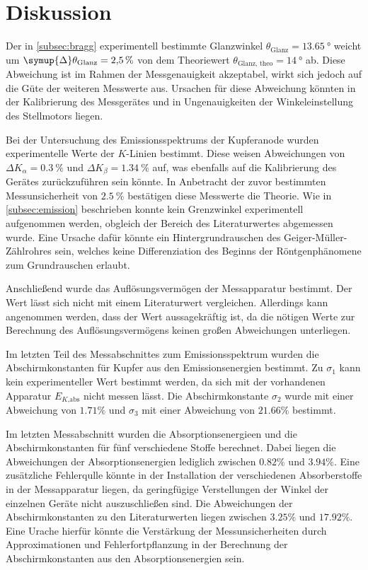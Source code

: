 \section{Diskussion}
\label{sec:Diskussion}
Der in \autoref{subsec:bragg} experimentell bestimmte Glanzwinkel $\theta_\text{Glanz} = \qty{13.65}{\degree}$ weicht um $\symup{\Delta} \theta_\text{Glanz} = \qty{2.5}{\percent}$
von dem Theoriewert $\theta_\text{Glanz, theo} = \qty{14}{\degree}$ ab. Diese Abweichung ist im Rahmen der Messgenauigkeit akzeptabel, wirkt sich jedoch auf die Güte 
der weiteren Messwerte aus. Ursachen für diese Abweichung könnten in der Kalibrierung des Messgerätes und in Ungenauigkeiten der Winkeleinstellung des Stellmotors liegen.

Bei der Untersuchung des Emissionsspektrums der Kupferanode wurden experimentelle Werte der $K$-Linien bestimmt. Diese weisen Abweichungen 
von $\Delta K_{\alpha} = \qty{0.3}{\percent}$ und $\Delta K_{\beta} = \qty{1.34}{\percent}$ auf, was ebenfalls auf die Kalibrierung des Gerätes zurückzuführen sein könnte.
In Anbetracht der zuvor bestimmten Messunsicherheit von $\qty{2.5}{\percent}$ bestätigen diese Messwerte die Theorie.
Wie in \autoref{subsec:emission} beschrieben konnte kein Grenzwinkel experimentell aufgenommen werden, obgleich der Bereich des Literaturwertes
abgemessen wurde. Eine Ursache dafür könnte ein Hintergrundrauschen des Geiger-Müller-Zählrohres sein, welches keine Differenziation des Beginns der Röntgenphänomene 
zum Grundrauschen erlaubt.  

Anschließend wurde das Auflösungsvermögen der Messapparatur bestimmt. Der Wert lässt sich nicht mit einem Literaturwert vergleichen. Allerdings kann angenommen werden, 
dass der Wert aussagekräftig ist, da die nötigen Werte zur Berechnung des Auflösungsvermögens keinen großen Abweichungen unterliegen.

Im letzten Teil des Messabschnittes zum Emissionsspektrum wurden die Abschirmkonstanten für Kupfer aus den Emissionsenergien bestimmt. Zu $\sigma_1$ kann kein experimenteller
Wert bestimmt werden, da sich mit der vorhandenen Apparatur $E_{K \text{,abs}}$ nicht messen lässt.
Die Abschirmkonstante $\sigma_2$ wurde mit einer Abweichung von $1.71\%$ und $\sigma_3$ mit einer Abweichung von $21.66\%$ bestimmt.

Im letzten Messabschnitt wurden die Absorptionsenergieen und die Abschirmkonstanten für fünf verschiedene Stoffe berechnet. Dabei liegen die Abweichungen der 
Absorptionsenergien lediglich zwischen $0.82\%$ und $3.94\%$. Eine zusätzliche Fehlerqulle könnte in der Installation der verschiedenen Absorberstoffe in der Messapparatur
liegen, da geringfügige Verstellungen der Winkel der einzelnen Geräte nicht auszuschließen sind.
Die Abweichungen der Abschirmkonstanten zu den Literaturwerten liegen zwischen $3.25\%$ und $17.92\%$. Eine Urache hierfür könnte die Verstärkung der Messunsicherheiten 
durch Approximationen und Fehlerfortpflanzung in der Berechnung der Abschirmkonstanten aus den Absorptionsenergien sein.

